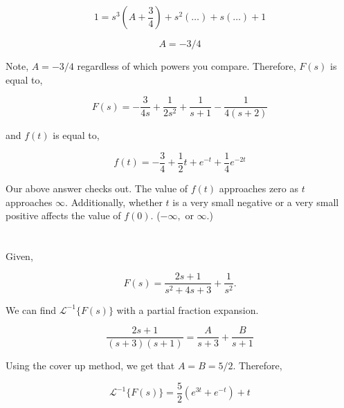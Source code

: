 \documentclass[12pt]{article}
\numberwithin{equation}{section}
\begin{document}
  \begin{equation}
    1 = s^3 \left( A + \frac{3}{4} \right) + s^2 (\ldots) + s(\ldots) + 1
  \end{equation}

  \begin{equation}
    A = -3/4
  \end{equation}

  Note, $ A = -3/4 $ regardless of which powers you compare. Therefore, $ F(s) $ is equal to,

  \begin{equation}
    F(s) = -\frac{3}{4s} + \frac{1}{2s^2} + \frac{1}{s + 1} - \frac{1}{4(s + 2)}
  \end{equation}

  and $ f(t) $ is equal to,

  \begin{equation}
    f(t) = - \frac{3}{4} + \frac{1}{2}t + e^{-t} + \frac{1}{4}e^{-2t}
  \end{equation}

  Our above answer checks out. The value of $ f(t) $ approaches zero as $ t $ approaches $ \infty. $ Additionally, whether $ t $ is a very small negative or a very small positive affects the value of $ f(0). $ ($ -\infty, \text{ or } \infty. $)

  \newpage

  \section{}

  Given,

  \[
      F(s) = \frac{2s + 1}{s ^2 + 4s + 3} + \frac{1}{s ^2}
    .\]

  We can find $ \mathcal{L}^{-1}\{F(s)\} $ with a partial fraction expansion.

  \begin{equation}
    \frac{2s + 1}{(s + 3)(s + 1)} = \frac{A}{s + 3} + \frac{B}{s + 1}
  \end{equation}

  Using the cover up method, we get that $ A = B = 5/2. $ Therefore,

  \begin{equation}
    \mathcal{L}^{-1}\{F(s)\} = \frac{5}{2} \left( e^{3t} + e^{-t} \right) + t
  \end{equation}






  \newpage
  \section{}
\end{document}
